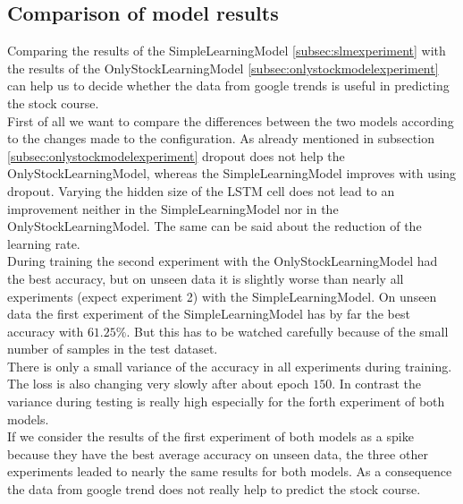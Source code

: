 \subsection{Comparison of model results}
\label{subsec:compmodelresults}	
Comparing the results of the SimpleLearningModel \ref{subsec:slmexperiment} with the results of the OnlyStockLearningModel \ref{subsec:onlystockmodelexperiment} can help us to decide whether the data from google trends is useful in predicting the stock course.\\
First of all we want to compare the differences between the two models according to the changes made to the configuration. As already mentioned in subsection \ref{subsec:onlystockmodelexperiment} dropout does not help the OnlyStockLearningModel, whereas the SimpleLearningModel improves with using dropout. Varying the hidden size of the LSTM cell does not lead to an improvement neither in the SimpleLearningModel nor in the OnlyStockLearningModel. The same can be said about the reduction of the learning rate.\\
During training the second experiment with the OnlyStockLearningModel had the best accuracy, but on unseen data it is slightly worse than nearly all experiments (expect experiment 2) with the SimpleLearningModel. On unseen data the first experiment of the SimpleLearningModel has by far the best accuracy with $61.25\%$. But this has to be watched carefully because of the small number of samples in the test dataset.\\
There is only a small variance of the accuracy in all experiments during training. The loss is also changing very slowly after about epoch $150$. In contrast the variance during testing is really high especially for the forth experiment of both models.\\
If we consider the results of the first experiment of both models as a spike because they have the best average accuracy on unseen data, the three other experiments leaded to nearly the same results for both models. As a consequence the data from google trend does not really help to predict the stock course.

